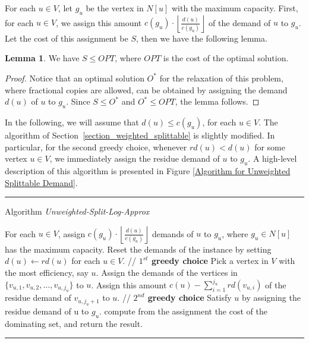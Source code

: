 \documentclass[a4paper,11pt]{article}
\theoremstyle{definition}
\newtheorem{lemma}[theorem]{Lemma}
\begin{document}
\smallskip

For each $u \in V$, let $g_u$ be the vertex in $N[u]$ with the maximum capacity. First, for each $u \in V$, we assign this amount $c(g_u) \cdot \left\lfloor \frac{d(u)}{c(g_u)} \right\rfloor$ of the demand of $u$ to $g_u$. Let the cost of this assignment be $S$, then we have the following lemma.

\begin{lemma} \label{lemma_last_copy}
We have $S \le OPT$, where $OPT$ is the cost of the optimal solution.
\end{lemma}

\begin{proof}
Notice that an optimal solution $O^*$ for the relaxation of this problem, where fractional copies are allowed, can be obtained by assigning the demand $d(u)$ of $u$ to $g_u$. Since $S \le O^*$ and $O^* \le OPT$, the lemma follows.
\end{proof}

In the following, we will assume that $d(u) \le c(g_u)$, for each $u \in V$. The algorithm of Section~\ref{section_weighted_splittable} is slightly modified. In particular, for the second greedy choice, whenever $rd(u) < d(u)$ for some vertex $u \in V$, we immediately assign the residue demand of $u$ to $g_u$. A high-level description of this algorithm 
is presented in Figure \ref{Algorithm for Unweighted Splittable Demand}.

\begin{figure*}[t]
\rule{\linewidth}{0.2mm}
\medskip
{{\sc Algorithm} {\em Unweighted-Split-Log-Approx}}

\begin{algorithmic}[1]
\STATE For each $u \in V$, assign $c(g_u) \cdot \left\lfloor \frac{d(u)}{c(g_u)} \right\rfloor$ demands of $u$ to $g_u$, where $g_u \in N[u]$ has the maximum capacity.
\STATE Reset the demands of the instance by setting $d(u) \longleftarrow rd(u)$ for each $u \in V$.
    \STATE // {\bf $1^{st}$ greedy choice}
    \STATE Pick a vertex in $V$ with the most efficiency, say $u$.
        \STATE Assign the demands of the vertices in $\{v_{u,1}, v_{u,2}, \ldots, v_{u,j_u}\}$ to $u$.
            \STATE Assign this amount $c(u)-\sum_{i=1}^{j_u}rd(v_{u,i})$ of the residue demand of $v_{u,j_u+1}$ to $u$.
        \ENDIF
    \STATE
    \STATE // {\bf $2^{nd}$ greedy choice}
        \STATE Satisfy $u$ by assigning the residue demand of u to $g_u$.
    \ENDIF
\ENDWHILE
\STATE compute from the assignment the cost of the dominating set, and return the result.

\end{algorithmic}
\rule{\linewidth}{0.2mm} \caption{The pseudo-code for the 
unweighted splittable demand model.} \label{Algorithm for Unweighted Splittable Demand}
\end{figure*}
\end{document}
